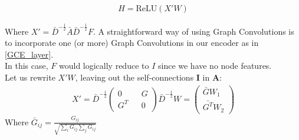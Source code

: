 \documentclass{report}
\begin{document}
	\begin{align}
	H = \text{ReLU}(X'W)
	\end{align}
	
	Where $X' = \bar{D}^{-\frac{1}{2}}\bar{A}\bar{D}^{-\frac{1}{2}}F$. A straightforward way of using Graph Convolutions is to incorporate one (or more) Graph Convolutions in our encoder as in \ref{GCE_layer}. \\ In this case, $F$ would logically reduce to $I$ since we have no node features. \\
	Let us rewrite $X'W$, leaving out the self-connections $\mathbf{I}$ in $\mathbf{A}$: 
	\begin{align}
	X' = \bar{D}^{-\frac{1}{2}}
	\left( \begin{matrix} 
	0 && G \\
	G^T && 0
	\end{matrix} \right) \bar{D}^{-\frac{1}{2}}W = 
	\left(\begin{matrix}
	\bar{G}W_1 \\
	\bar{G^T}W_2
	\end{matrix}\right)\label{highlow}  
	\end{align}
	Where $\bar{G}_{ij} = 
	\frac{G_{ij}}{\sqrt{\sum_i G_{ij} \sum_{j} G_{ij}}}$ 
	
\end{document}
